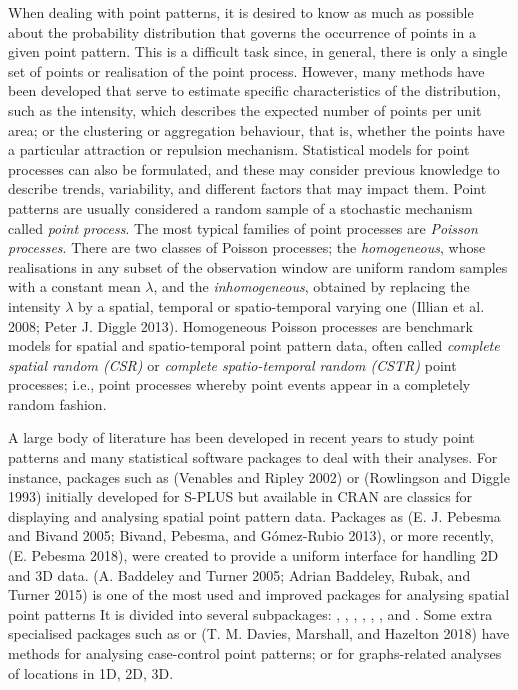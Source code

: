 When dealing with point patterns, it is desired to know as much as possible about the probability distribution that governs the occurrence of points in a given point pattern. This is a difficult task since, in general, there is only a single set of points or realisation of the point process. However, many methods have been developed that serve to estimate specific characteristics of the distribution, such as the intensity, which describes the expected number of points per unit area; or the clustering or aggregation behaviour, that is, whether the points have a particular attraction or repulsion mechanism. Statistical models for point processes can also be formulated, and these may consider previous knowledge to describe trends, variability, and different factors that may impact them. Point patterns are usually considered a random sample of a stochastic mechanism called \emph{point process}. The most typical families of point processes are \emph{Poisson processes}. There are two classes of Poisson processes; the \emph{homogeneous}, whose realisations in any subset of the observation window are uniform random samples with a constant mean \(\lambda\), and the \emph{inhomogeneous}, obtained by replacing the intensity \(\lambda\) by a spatial, temporal or spatio-temporal varying one (Illian et al. 2008; Peter J. Diggle 2013). Homogeneous Poisson processes are benchmark models for spatial and spatio-temporal point pattern data, often called \emph{complete spatial random (CSR)} or \emph{complete spatio-temporal random (CSTR)} point processes; i.e., point processes whereby point events appear in a completely random fashion.

A large body of literature has been developed in recent years to study point patterns and many statistical software packages to deal with their analyses. For instance, packages such as  (Venables and Ripley 2002) or  (Rowlingson and Diggle 1993) initially developed for S-PLUS but available in CRAN are classics for displaying and analysing spatial point pattern data. Packages as  (E. J. Pebesma and Bivand 2005; Bivand, Pebesma, and Gómez-Rubio 2013), or more recently,  (E. Pebesma 2018), were created to provide a uniform interface for handling 2D and 3D data.  (A. Baddeley and Turner 2005; Adrian Baddeley, Rubak, and Turner 2015) is one of the most used and improved packages for analysing spatial point patterns It is divided into several subpackages: , , , , , ,  and . Some extra specialised packages such as  or  (T. M. Davies, Marshall, and Hazelton 2018) have methods for analysing case-control point patterns; or  for graphs-related analyses of locations in 1D, 2D, 3D.

